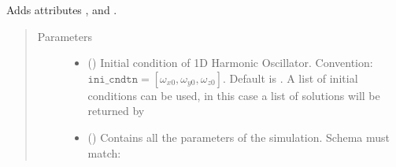 \documentclass[a4paper,landscape,10pt,english]{sphinxmanual}
\begin{document}
\begin{fulllineitems}
\begin{fulllineitems}
Adds attributes
{\hyperref[\detokenize{code_docs/simulation_api.simulation:simulation_api.simulation.simulations.ChenLeeAttractor.a}]{}},
{\hyperref[\detokenize{code_docs/simulation_api.simulation:simulation_api.simulation.simulations.ChenLeeAttractor.b}]{}} and
{\hyperref[\detokenize{code_docs/simulation_api.simulation:simulation_api.simulation.simulations.ChenLeeAttractor.c}]{}}.
\begin{quote}\begin{description}
\item[{Parameters}] \leavevmode\begin{itemize}
\item {} 
 (\sphinxstyleliteralemphasis{\sphinxupquote{, }}\sphinxstyleliteralemphasis{\sphinxupquote{ (}}\sphinxstyleliteralemphasis{\sphinxupquote{,}}\sphinxstyleliteralemphasis{\sphinxupquote{)}}) \textendash{} Initial condition of 1D Harmonic Oscillator. Convention:
\(\texttt{ini_cndtn} = [\omega_{x0}, \omega_{y0}, \omega_{z0}]\).
Default is \sphinxcode{\sphinxupquote{{[}10, 10, 0{]}}}. A list of initial conditions can be
used, in this case a list of solutions will be returned by
{\hyperref[\detokenize{code_docs/simulation_api.simulation:simulation_api.simulation.simulations.Simulation.simulate}]{}}

\item {} 
 (\sphinxstyleliteralemphasis{\sphinxupquote{, }}) \textendash{} 
Contains all the parameters of the simulation. Schema must match:

\begin{sphinxVerbatim}[commandchars=\\\{\}]
          
          
          
\end{sphinxVerbatim}


\end{itemize}
\end{description}
\end{quote}
\end{fulllineitems}
\end{fulllineitems}
\end{document}
